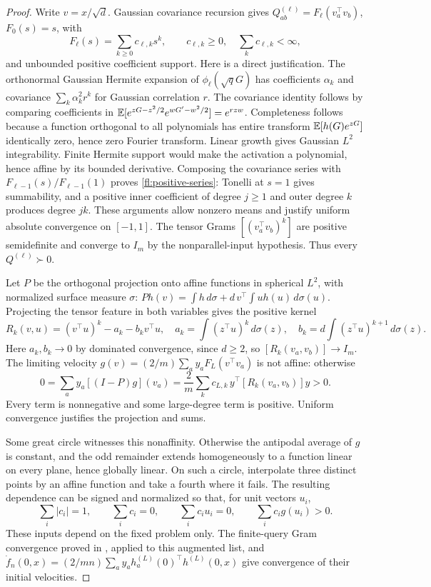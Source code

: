 \begin{proof}
Write $v=x/\sqrt d$. Gaussian covariance recursion gives
$Q^{(\ell)}_{ab}=F_\ell(v_a^\top v_b)$, $F_0(s)=s$, with
\begin{equation}
 F_\ell(s)=\sum_{k\ge0}c_{\ell,k}s^k,\qquad
 c_{\ell,k}\ge0,\quad \sum_kc_{\ell,k}<\infty,
 \label{fl:positive-series}
\end{equation}
and unbounded positive coefficient support. Here is a direct justification.
The orthonormal Gaussian Hermite expansion of
$\phi_\ell(\sqrt qG)$ has coefficients $\alpha_k$ and covariance
$\sum_k\alpha_k^2r^k$ for Gaussian correlation $r$. The covariance identity
follows by comparing coefficients in
$\mathbb E[e^{zG-z^2/2}e^{wG'-w^2/2}]=e^{rzw}$.
Completeness follows because a function orthogonal to all polynomials has
entire transform $\mathbb E[h(G)e^{zG}]$ identically zero, hence zero Fourier
transform. Linear growth gives Gaussian $L^2$ integrability. Finite Hermite
support would make the activation a polynomial, hence affine by its bounded
derivative. Composing the covariance series with
$F_{\ell-1}(s)/F_{\ell-1}(1)$ proves \eqref{fl:positive-series}:
Tonelli at $s=1$ gives summability, and a positive inner coefficient of
degree $j\ge1$ and outer degree $k$ produces degree $jk$. These arguments
allow nonzero means and justify uniform absolute convergence on $[-1,1]$.
The tensor Grams $[(v_a^\top v_b)^k]$ are positive semidefinite and converge
to $I_m$ by the nonparallel-input hypothesis. Thus every $Q^{(\ell)}\succ0$.

Let $P$ be the orthogonal projection onto affine functions in spherical
$L^2$, with normalized surface measure $\sigma$:
$Ph(v)=\int h\,d\sigma+d\,v^\top\int uh(u)\,d\sigma(u)$.
Projecting the tensor feature in both variables gives the positive kernel
\[
 R_k(v,u)=(v^\top u)^k-a_k-b_kv^\top u,
 \quad a_k=\int(z^\top u)^k\,d\sigma(z),\quad
 b_k=d\int(z^\top u)^{k+1}\,d\sigma(z).
\]
Here $a_k,b_k\to0$ by dominated convergence, since $d\ge2$, so
$[R_k(v_a,v_b)]\to I_m$. The limiting velocity
$g(v)=(2/m)\sum_a y_aF_L(v^\top v_a)$ is not affine: otherwise
\[
 0=\sum_a y_a[(I-P)g](v_a)
   =\frac2m\sum_kc_{L,k}\,y^\top[R_k(v_a,v_b)]y>0.
\]
Every term is nonnegative and some large-degree term is positive.
Uniform convergence justifies the projection and sums.

Some great circle witnesses this nonaffinity. Otherwise the antipodal
average of $g$ is constant, and the odd remainder extends homogeneously
to a function linear on every plane, hence globally linear. On such a
circle, interpolate three distinct points by an affine function and take
a fourth where it fails. The resulting dependence can be signed and normalized
so that, for unit vectors $u_i$,
\begin{equation}
 \sum_i|c_i|=1,\qquad \sum_i c_i=0,\qquad
 \sum_i c_i u_i=0,\qquad \sum_i c_i g(u_i)>0.
 \label{fl:four-witness}
\end{equation}
These inputs depend on the fixed problem only. The finite-query Gram
convergence proved in , applied to this augmented list, and
$\dot f_n(0,x)=(2/mn)\sum_a y_a h_a^{(L)}(0)^\top h^{(L)}(0,x)$
give convergence of their initial velocities.
\end{proof}

